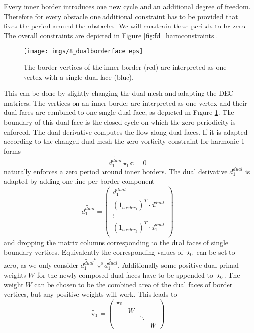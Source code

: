 Every inner border introduces one new cycle and an additional degree of freedom. Therefore for every obstacle one additional constraint has to be provided that fixes the period around the obstacles. We will constrain these periods to be zero. The overall constraints are depicted in Figure \ref{fig:fd_harmconstraints}.


\begin{figure}%
\begin{center}
\texttt{[image: imgs/8\_dualborderface.eps]}%
\end{center}
\caption{The border vertices of the inner border (red) are interpreted as one vertex with a single dual face (blue).}%
\label{fig:fd_dualborderface}%
\end{figure}

This can be done by slightly changing the dual mesh and adapting the DEC matrices. The vertices on an inner border are interpreted as one vertex and their dual faces are combined to one single dual face, as depicted in Figure \ref{fig:fd_dualborderface}. The boundary of this dual face is the closed cycle on which the zero periodicity is enforced. The dual derivative computes the flow along dual faces. If it is adapted according to the changed dual mesh the zero vorticity constraint for harmonic 1-forms
\[\widetilde{d^{dual}_1} \star_1 \textbf{c} =0\]
naturally enforces a zero period around inner borders. The dual derivative $d_1^{dual}$ is adapted by adding one line per border component
\[\widetilde{d_1^{dual}} = \begin{pmatrix} d_1^{dual} \\
(1_{border_1})^T \cdot d_1^{dual} \\
\vdots \\
(1_{border_k})^T \cdot d_1^{dual} \\
\end{pmatrix}\]
and dropping the matrix columns corresponding to the dual faces of single boundary vertices. Equivalently the corresponding values of $\star_0$ can be set to zero, as we only consider $\widetilde{d_1^{dual}}^t\star^0 \widetilde{d_1^{dual}}$.
Additionally some positive dual primal weights $W$ for the newly composed dual faces have to be appended to $\star_0$. The weight $W$ can be chosen to be the combined area of the dual faces of border vertices, but any positive weights will work. This leads to
\[\widetilde{\star_0} = \begin{pmatrix}\star_0& & &\\
&W& &\\
& &\ddots &\\
& & & W \end{pmatrix}\]


